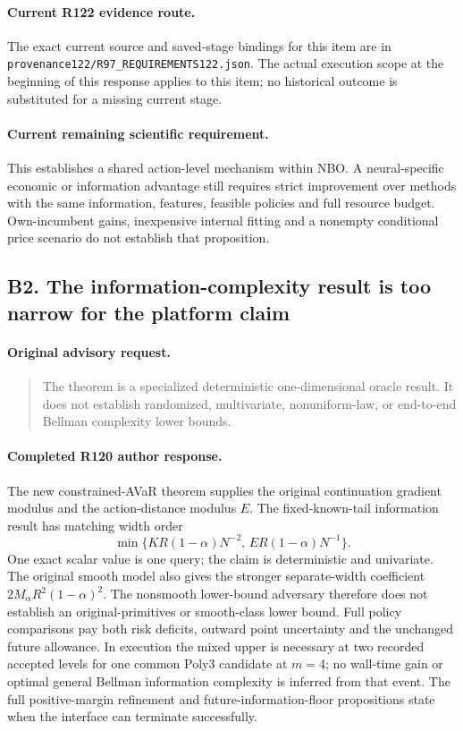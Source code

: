 \paragraph{Current R122 evidence route.}
The exact current source and saved-stage bindings for this item are in \nolinkurl{provenance122/R97_REQUIREMENTS122.json}. The actual execution scope at the beginning of this response applies to this item; no historical outcome is substituted for a missing current stage.
\paragraph{Current remaining scientific requirement.}
This establishes a shared action-level mechanism within NBO. A neural-specific economic or information advantage still requires strict improvement over methods with the same information, features, feasible policies and full resource budget. Own-incumbent gains, inexpensive internal fitting and a nonempty conditional price scenario do not establish that proposition.

\subsection{B2. The information-complexity result is too narrow for the platform claim}
\label{response122:B2}

\paragraph{Original advisory request.}
\begin{quote}
The theorem is a specialized deterministic one-dimensional oracle result. It does not establish randomized, multivariate, nonuniform-law, or end-to-end Bellman complexity lower bounds.
\end{quote}

\paragraph{Completed R120 author response.}
The new constrained-AVaR theorem supplies the original continuation gradient modulus and the action-distance modulus $E$. The fixed-known-tail information result has matching width order
\[
 \min\{KR(1-\alpha)N^{-2},\,ER(1-\alpha)N^{-1}\}.
\]
One exact scalar value is one query; the claim is deterministic and univariate. The original smooth model also gives the stronger separate-width coefficient $2M_\alpha R^2(1-\alpha)^2$. The nonsmooth lower-bound adversary therefore does not establish an original-primitives or smooth-class lower bound. Full policy comparisons pay both risk deficits, outward point uncertainty and the unchanged future allowance. In execution the mixed upper is necessary at two recorded accepted levels for one common Poly3 candidate at $m=4$; no wall-time gain or optimal general Bellman information complexity is inferred from that event. The full positive-margin refinement and future-information-floor propositions state when the interface can terminate successfully.

